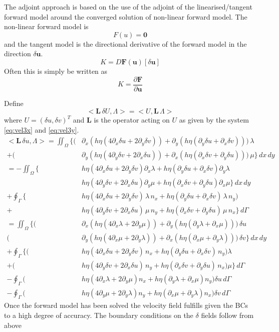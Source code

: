 \documentclass[10pt,a4paper]{book}
\newcommand{\p}{\partial}
\begin{document}
The adjoint approach is based on the use of the adjoint of the
linearised/tangent forward model around the converged solution of non-linear
forward model.  The non-linear forward model is 
\[ F(u)=\bm{0} \] and the tangent model is the directional
derivative of the forward model in the direction $\delta \bm{u}$.
\[
K=D \bm{F}(\bm{u})[\delta \bm{u}]
\]
Often this is simply be written as
\[
K=\frac{\p \bm{F}}{\p {\bm{u}}}
\]

Define
\[
<\bm{L}\, \delta U , \Lambda> = < U , \bm{L}\, \Lambda>
\]
where $U=(\delta u,\delta v)^T$ and $\bm{L}$ is the operator acting on $U$ as given by the system \eqref{eq:vel3x} and \eqref{eq:vel3y}.
\begin{align*}
<\bm{L} \, \delta u , \Lambda > 
= \iint_{\Omega}   \big \{ ( &\p_x ( h \eta ( 4 \p_x \delta u + 2 \p_y \delta v)) + \p_y ( h \eta (\p_y \delta u + \p_x \delta v))) \, \lambda \\
                           +(&\p_y (  h \eta ( 4 \p_y \delta v + 2 \p_x \delta u )) +\p_x ( h \eta (\p_x \delta v + \p_y \delta u ))) \, \mu \big \} \, dx \, dy \\
 =  -\iint_{\Omega} \big \{ &h \eta ( 4 \p_x \delta u + 2 \p_y \delta v ) \p_x \lambda +  h \eta (\p_y \delta u + \p_x \delta v) \p_y \lambda  \\
                            &h \eta ( 4 \p_y \delta v + 2 \p_x \delta u ) \p_y \mu     +  h \eta (\p_x \delta v + \p_y \delta u) \p_x \mu \big \} \, dx \, dy \\
+ \oint_{\Gamma} \big \{ &h \eta ( 4\p_x \delta u + 2 \p_y \delta v) \, \lambda \, n_x +  h \eta (\p_y \delta u + \p_x \delta v) \, \lambda \, n_y )  \\
+                        &h \eta ( 4\p_y \delta v + 2 \p_x \delta u) \, \mu \, n_y     +  h \eta (\p_x \delta v + \p_y \delta u) \, \mu \, n_x   \big \} \, d\Gamma\\
=  \iint_{\Omega} \big \{ (&\p_x ( h \eta ( 4 \p_x \lambda + 2 \p_y \mu )) +  \p_y ( h \eta (\p_y \lambda + \p_x \mu))) \, \delta u \\
                          (&\p_y ( h \eta ( 4 \p_x \mu + 2 \p_y \lambda )) + \p_x  ( h \eta (\p_x \mu + \p_y \lambda)))  \, \delta v \big \} \, dx \, dy\\
+ \oint_{\Gamma} \big \{ (&h \eta ( 4\p_x \delta u + 2 \p_y \delta v)  \, n_x +  h \eta (\p_y \delta u + \p_x \delta v) \,  n_y ) \lambda  \\
+                        (&h \eta ( 4\p_y \delta v + 2 \p_x \delta u)  \, n_y +  h \eta (\p_x \delta v + \p_y \delta u) \,  n_x ) \mu  \big \} \, d\Gamma\\
  -\oint_{\Gamma} ( &h \eta ( 4 \p_x \lambda + 2 \p_y \mu )  n_x +   h \eta (\p_y \lambda + \p_x \mu) n_y ) \delta u \,d\Gamma \nonumber \\
  -\oint_{\Gamma} ( &h \eta ( 4 \p_y \mu + 2 \p_y \lambda )  n_y +   h \eta (\p_x \mu + \p_y \lambda)  n_x ) \delta v \, d\Gamma \nonumber 
\end{align*}
Once the forward model has been solved the velocity field fulfills given
the BCs to a high degree of accuracy.  The boundary conditions on
the $\delta$ fields follow from above
\end{document}
